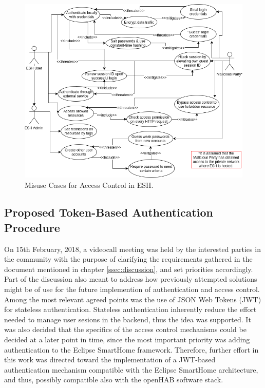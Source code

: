 \documentclass[12pt]{article}
\begin{document}
\begin{figure} [ht] 
\begin{center}
\includegraphics[width=\textwidth]{esh_misuse_cases}
\caption{Misuse Cases for Access Control in ESH.}
\label{fig:misuse_cases}
\end{center}
\end{figure}

\subsection{Proposed Token-Based Authentication Procedure}

On 15th February, 2018, a videocall meeting was held by the interested parties in the community with the purpose of clarifying the requirements gathered in the document mentioned in chapter \ref{ssec:discussion}, and set priorities accordingly. Part of the discussion also meant to address how previously attempted solutions might be of use for the future implemention of authentication and access control. Among the most relevant agreed points was the use of JSON Web Tokens (JWT) for stateless authentication. Stateless authentication inherently reduce the effort needed to manage user sesions in the backend, thus the idea was supported. It was also decided that the specifics of the access control mechanisms could be decided at a later point in time, since the most important priority was adding authentication to the Eclipse SmartHome framework. Therefore, further effort in this work was directed toward the implementation of a JWT-based authentication mechanism compatible with the Eclipse SmartHome architecture, and thus, possibly compatible also with the openHAB software stack.
\end{document}
